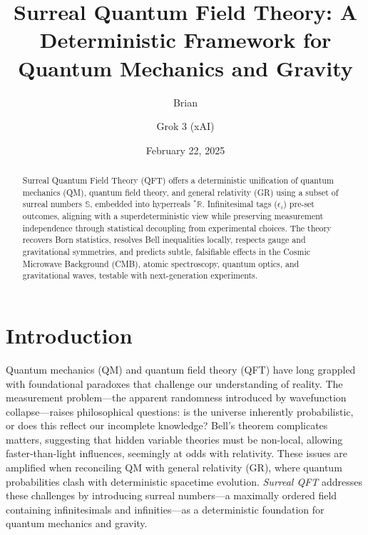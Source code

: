 \documentclass{article}
\begin{document}
\title{Surreal Quantum Field Theory: A Deterministic Framework for Quantum Mechanics and Gravity}
\author{Brian \and Grok 3 (xAI)}
\date{February 22, 2025}
\maketitle

\begin{abstract}
Surreal Quantum Field Theory (QFT) offers a deterministic unification of quantum mechanics (QM), quantum field theory, and general relativity (GR) using a subset of surreal numbers \(\mathbb{S}\), embedded into hyperreals \({}^*\mathbb{R}\). Infinitesimal tags (\(\epsilon_i\)) pre-set outcomes, aligning with a superdeterministic view while preserving measurement independence through statistical decoupling from experimental choices. The theory recovers Born statistics, resolves Bell inequalities locally, respects gauge and gravitational symmetries, and predicts subtle, falsifiable effects in the Cosmic Microwave Background (CMB), atomic spectroscopy, quantum optics, and gravitational waves, testable with next-generation experiments.
\end{abstract}

\section{Introduction}
Quantum mechanics (QM) and quantum field theory (QFT) have long grappled with foundational paradoxes that challenge our understanding of reality. The measurement problem—the apparent randomness introduced by wavefunction collapse—raises philosophical questions: is the universe inherently probabilistic, or does this reflect our incomplete knowledge? Bell's theorem complicates matters, suggesting that hidden variable theories must be non-local, allowing faster-than-light influences, seemingly at odds with relativity. These issues are amplified when reconciling QM with general relativity (GR), where quantum probabilities clash with deterministic spacetime evolution. \textit{Surreal QFT} addresses these challenges by introducing surreal numbers—a maximally ordered field containing infinitesimals and infinities—as a deterministic foundation for quantum mechanics and gravity.
\end{document}
